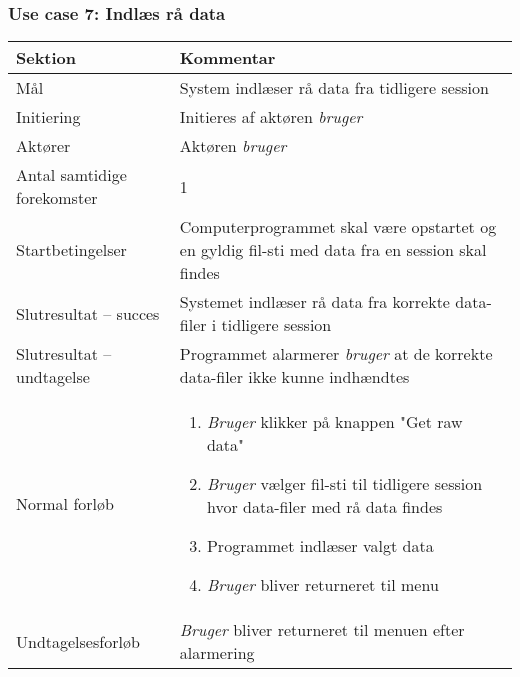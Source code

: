 \documentclass[kravspec.tex]{subfiles}
\begin{document}
	\subsubsection{Use case 7: Indlæs rå data}
	\begin{tabular}{|l|p{7.7cm}|}
		\hline \textbf{Sektion} 	& \textbf{Kommentar} \\ 
		\hline Mål  & System indlæser rå data fra tidligere session \\ 
		\hline Initiering  & Initieres af aktøren \textit{bruger} \\ 
		\hline Aktører & Aktøren \textit{bruger} \\ 
		\hline Antal samtidige forekomster & 1 \\ 
		\hline Startbetingelser & Computerprogrammet skal være opstartet og en gyldig fil-sti med data fra en session skal findes  \\ 
		\hline Slutresultat – succes & Systemet indlæser rå data fra korrekte data-filer i tidligere session \\ 
		\hline Slutresultat – undtagelse & Programmet alarmerer \textit{bruger} at de korrekte data-filer ikke kunne indhændtes \\ 
		\hline Normal forløb & \begin{enumerate}
			\item \textit{Bruger} klikker på knappen "Get raw data"
			\item \textit{Bruger} vælger fil-sti til tidligere session hvor data-filer med rå data findes
			\item Programmet indlæser valgt data
			\item \textit{Bruger} bliver returneret til menu
			\end{enumerate} \\
		\hline Undtagelsesforløb & \textit{Bruger} bliver returneret til menuen efter alarmering \\ 
		\hline 
	\end{tabular}
	
\end{document}
